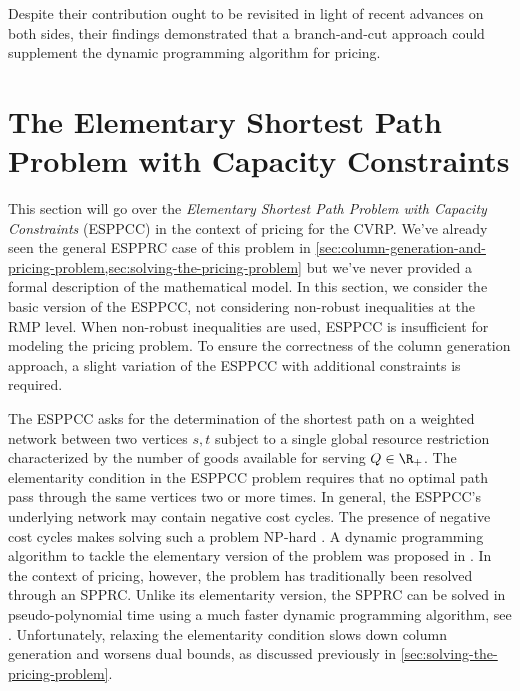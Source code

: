 Despite their contribution ought to be revisited in light of recent advances on both sides,
their findings demonstrated that a branch-and-cut approach
could supplement the dynamic programming algorithm for pricing.

\section{The Elementary Shortest Path Problem with Capacity Constraints}
\label{sec:the-elementary-shortest-path-problem-with-capacity-constraints}

This section will go over the \textit{Elementary Shortest Path Problem with Capacity Constraints} (ESPPCC)
in the context of pricing for the CVRP.
We've already seen the general ESPPRC case of this problem in
\cref{sec:column-generation-and-pricing-problem,sec:solving-the-pricing-problem}
but we've never provided a formal description of the mathematical model.
In this section, we consider the basic version of the ESPPCC,
not considering non-robust inequalities at the RMP level.
When non-robust inequalities are used, ESPPCC is insufficient for modeling the pricing problem.
To ensure the correctness of the column generation approach,
a slight variation of the ESPPCC with additional constraints is required.

The ESPPCC asks for the determination of the shortest path on a weighted network
between two vertices $s, t$
subject to a single global resource restriction characterized
by the number of goods available for serving $Q \in \R_{+}$.
The elementarity condition in the ESPPCC problem requires that
no optimal path pass through the same vertices two or more times.
In general, the ESPPCC's underlying network may contain negative cost cycles.
The presence of negative cost cycles makes solving such a problem NP-hard \parencite{dror1994}.
A dynamic programming algorithm
to tackle the elementary version of the problem
was proposed in \textcite{feillet2004}.
In the context of pricing, however, the problem has traditionally been resolved through an SPPRC.
Unlike its elementarity version, the SPPRC can be solved in pseudo-polynomial time
using a much faster dynamic programming algorithm, see \textcite{desrochers1992}.
Unfortunately, relaxing the elementarity condition
slows down column generation and worsens dual bounds,
as discussed previously in \cref{sec:solving-the-pricing-problem}.

\medskip

